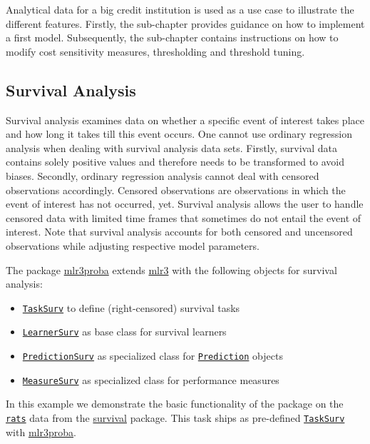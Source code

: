 \documentclass[]{article}
\providecommand{\tightlist}{%
  \setlength{\itemsep}{0pt}\setlength{\parskip}{0pt}}
\begin{document}
Analytical data for a big credit institution is used as a use case to illustrate the different features.
Firstly, the sub-chapter provides guidance on how to implement a first model.
Subsequently, the sub-chapter contains instructions on how to modify cost sensitivity measures, thresholding and threshold tuning.

\hypertarget{survival}{%
\subsection{Survival Analysis}\label{survival}}

Survival analysis examines data on whether a specific event of interest takes place and how long it takes till this event occurs.
One cannot use ordinary regression analysis when dealing with survival analysis data sets.
Firstly, survival data contains solely positive values and therefore needs to be transformed to avoid biases.
Secondly, ordinary regression analysis cannot deal with censored observations accordingly.
Censored observations are observations in which the event of interest has not occurred, yet.
Survival analysis allows the user to handle censored data with limited time frames that sometimes do not entail the event of interest.
Note that survival analysis accounts for both censored and uncensored observations while adjusting respective model parameters.

The package \href{https://mlr3proba.mlr-org.com}{mlr3proba} extends \href{https://mlr3.mlr-org.com}{mlr3} with the following objects for survival analysis:

\begin{itemize}
\tightlist
\item
  \href{https://mlr3proba.mlr-org.com/reference/TaskSurv.html}{\texttt{TaskSurv}} to define (right-censored) survival tasks
\item
  \href{https://mlr3proba.mlr-org.com/reference/LearnerSurv.html}{\texttt{LearnerSurv}} as base class for survival learners
\item
  \href{https://mlr3proba.mlr-org.com/reference/PredictionSurv.html}{\texttt{PredictionSurv}} as specialized class for \href{https://mlr3.mlr-org.com/reference/Prediction.html}{\texttt{Prediction}} objects
\item
  \href{https://mlr3proba.mlr-org.com/reference/MeasureSurv.html}{\texttt{MeasureSurv}} as specialized class for performance measures
\end{itemize}

In this example we demonstrate the basic functionality of the package on the \href{https://www.rdocumentation.org/packages/survival/topics/rats}{\texttt{rats}} data from the \href{https://cran.r-project.org/package=survival}{survival} package.
This task ships as pre-defined \href{https://mlr3proba.mlr-org.com/reference/TaskSurv.html}{\texttt{TaskSurv}} with \href{https://mlr3proba.mlr-org.com}{mlr3proba}.
\end{document}
